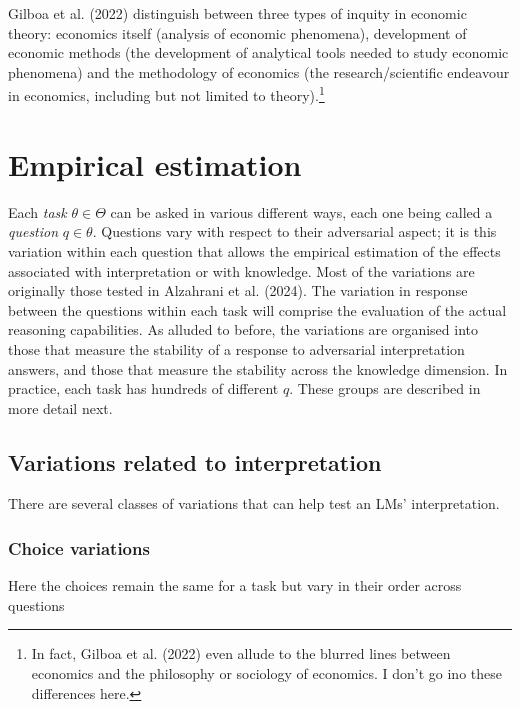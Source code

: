 \documentclass[
]{article}
\begin{document}
Gilboa et al. (2022) distinguish between three types of inquity in
economic theory: economics itself (analysis of economic phenomena),
development of economic methods (the development of analytical tools
needed to study economic phenomena) and the methodology of economics
(the research/scientific endeavour in economics, including but not
limited to theory).\footnote{In fact, Gilboa et al. (2022) even allude
  to the blurred lines between economics and the philosophy or sociology
  of economics. I don't go ino these differences here.}

\hypertarget{empirical-estimation}{%
\section{Empirical estimation}\label{empirical-estimation}}

Each \emph{task} \(\theta \in \Theta\) can be asked in various different
ways, each one being called a \emph{question} \(q \in \theta\).
Questions vary with respect to their adversarial aspect; it is this
variation within each question that allows the empirical estimation of
the effects associated with interpretation or with knowledge. Most of
the variations are originally those tested in Alzahrani et al. (2024).
The variation in response between the questions within each task will
comprise the evaluation of the actual reasoning capabilities. As alluded
to before, the variations are organised into those that measure the
stability of a response to adversarial interpretation answers, and those
that measure the stability across the knowledge dimension. In practice,
each task has hundreds of different \(q\). These groups are described in
more detail next.

\hypertarget{variations-related-to-interpretation}{%
\subsection{Variations related to
interpretation}\label{variations-related-to-interpretation}}

There are several classes of variations that can help test an LMs'
interpretation.

\hypertarget{choice-variations}{%
\subsubsection{Choice variations}\label{choice-variations}}

Here the choices remain the same for a task but vary in their order
across questions
\end{document}
